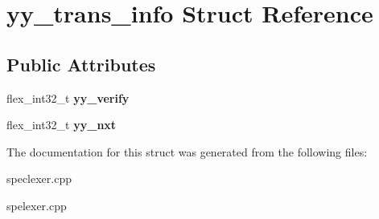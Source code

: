 \hypertarget{structyy__trans__info}{}\section{yy\+\_\+trans\+\_\+info Struct Reference}
\label{structyy__trans__info}
\subsection*{Public Attributes}
\begin{DoxyCompactItemize}
\item 
flex\+\_\+int32\+\_\+t {\bfseries yy\+\_\+verify}\hypertarget{structyy__trans__info_a5c9f61e770deef50bd4e697310342fe9}{}\label{structyy__trans__info_a5c9f61e770deef50bd4e697310342fe9}

\item 
flex\+\_\+int32\+\_\+t {\bfseries yy\+\_\+nxt}\hypertarget{structyy__trans__info_ae0715250c2bef261e596e77e0030f13e}{}\label{structyy__trans__info_ae0715250c2bef261e596e77e0030f13e}

\end{DoxyCompactItemize}


The documentation for this struct was generated from the following files\+:\begin{DoxyCompactItemize}
\item 
speclexer.\+cpp\item 
spelexer.\+cpp\end{DoxyCompactItemize}
